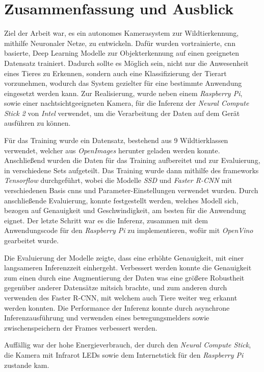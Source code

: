 \chapter{Zusammenfassung und Ausblick}\label{kap:zusammenfassungausblick}


Ziel der Arbeit war, es ein autonomes
Kamerasystem zur Wildtierkennung,
mithilfe Neuronaler Netze, zu entwickeln.
Dafür wurden vortrainierte, \Gls{cnn} basierte, 
Deep Learning Modelle zur Objekterkennung
auf einen geeigneten Datensatz trainiert.
Dadurch sollte es Möglich sein, nicht 
nur die Anwesenheit eines Tieres 
zu Erkennen, sondern auch eine 
Klassifizierung der Tierart 
vorzunehmen, wodurch das System
gezielter für eine bestimmte
Anwendung eingesetzt werden kann.
Zur Realisierung, wurde neben einem \textit{Raspberry
Pi}, sowie einer nachtsichtgeeigneten 
Kamera, für die Inferenz der 
\textit{Neural Compute Stick 2}
von \textit{Intel} verwendet, um die 
Verarbeitung der Daten auf dem 
Gerät ausführen zu können.
\vspace{0.5cm}

Für das Training wurde ein Datensatz, 
bestehend aus 9 Wildtierklassen verwendet,
welcher aus \textit{OpenImages} herunter 
geladen werden konnte.
Anschließend wurden die Daten 
für das Training aufbereitet und
zur Evaluierung, in verschiedene 
Sets aufgeteilt.
Das Training wurde dann mithilfe des 
\Glspl{framework} \textit{Tensorflow} durchgeführt,
wobei die Modelle \textit{SSD} und
\textit{Faster R-CNN} mit verschiedenen
Basis \Glspl{cnn} und Parameter-Einstellungen
verwendet wurden.
Durch anschließende Evaluierung, konnte 
festgestellt werden, welches Modell sich,
bezogen auf Genauigkeit und Geschwindigkeit,
am besten für die Anwendung eignet.
Der letzte Schritt war es die Inferenz, zusammen 
mit dem Anwendungscode für den \textit{Raspberry Pi} 
zu implementieren, wofür mit \textit{OpenVino} gearbeitet 
wurde.
\vspace{0.5cm}

Die Evaluierung der Modelle zeigte, dass 
eine erhöhte Genauigkeit, mit einer 
langsameren Inferenzzeit einhergeht.
Verbessert werden konnte die Genauigkeit 
zum einen durch eine Augmentierung der Daten 
was eine größere Robustheit gegenüber anderer 
Datensätze mitsich brachte, und zum 
anderen durch verwenden des Faster 
R-CNN, mit welchem auch Tiere weiter 
weg erkannt werden konnten.
Die Performance der Inferenz konnte durch 
asynchrone Inferenzausführung und 
verwenden eines bewegungsmelders sowie 
zwischenspeichern der Frames verbessert werden.
\vspace{0.5cm}


Auffällig war der hohe Energieverbrauch, 
der durch den \textit{Neural Compute Stick}, die Kamera mit 
Infrarot LEDs sowie dem Internetstick für den 
\textit{Raspberry Pi} zustande kam.


